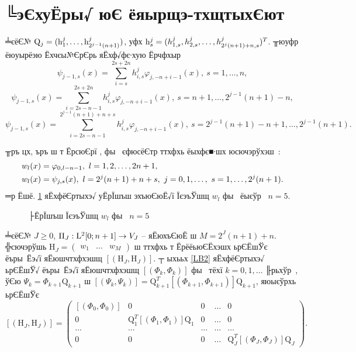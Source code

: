 \documentclass[12pt, a4paper, oneside]{article}
\begin{document}
\section{╚эЄхуЁры√ юЄ ёяырщэ-тхщтыхЄют}
╧єёЄ№ ${\rm Q}_j=({\rm h}_1^j,\dots,{\rm h}_{2^{j-1}(n+1)}^j)$, уфх ${\rm h}_s^j=(h_{1,s}^j,h_{2,s}^j,\dots,h_{2^j (n+1)+n,s}^j)^T$. ╥юуфр   ёюуырёэю Ёхчєы№ЄрЄрь яЁхф√фє∙хую Ёрчфхыр
\begin{equation}\label{U31}
\psi_{j-1,s}(x)=\sum\limits_{i=s}^{2s+2n}h_{i,s}^j\varphi_{j,-n+i-1}(x),~s=1,\dots,n,
\end{equation}
\begin{equation}\label{U32}
\psi_{j-1,s}(x)=\sum\limits_{i=2s-n-1}^{2s+2n}h_{i,s}^j\varphi_{j,-n+i-1}(x),~s=n+1,\dots,2^{j-1}(n+1)-n,
\end{equation}
\begin{equation}\label{U33}
\psi_{j-1,s}(x)=\sum\limits_{i=2s-n-1}^{2^{j-1}(n+1)+n+s}h_{i,s}^j\varphi_{j,-n+i-1}(x),~s=2^{j-1}(n+1)-n+1,\dots,2^{j-1}(n+1).
\end{equation}
\par ╥ръ цх, ъръ ш т ЁрсюЄрї \cite{Lepik1, Lepik2, Lepik3, Lepik4, Lepik}, фы  єфюсёЄтр  ттхфхь ёыхфє■∙шх юсючэрўхэш :
\begin{align}
&w_l(x)=\varphi_{0,l-n-1},~l=1,2,\dots,2n+1,\notag\\
&w_l(x)=\psi_{j,s}(x),~l=2^j(n+1)+n+s,~j=0,1,\dots,~s=1,\dots,2^{j}(n+1).\notag
\end{align}
═р Ёшё. \ref{graph_w} яЁхфёЄртыхэ√ уЁрЇшъш эхъюЄюЁ√ї ЇєэъЎшщ $w_l$ фы  ёыєўр  $n=5$.
\begin{figure}[h]
\caption{├ЁрЇшъш ЇєэъЎшщ $w_l$ фы  $n=5$}
\label{graph_w}
\end{figure}
\par ╧єёЄ№ $J\geqslant 0$,  $\Pi_{J} : {\rm L}^2[0;n+1]\to V_{J}$ -- яЁюхъЄюЁ ш $M=2^{J}(n+1)+n$. ╬сючэрўшь $\mathrm{H}_J=\begin{pmatrix}w_1 & \dots & w_M\end{pmatrix}$ ш ттхфхь т ЁрёёьюЄЁхэшх ьрЄЁшЎє ёъры Ёэ√ї яЁюшчтхфхэшщ $[(\mathrm{H}_J, \mathrm{H}_J)]$. ┬ ыхььх \ref{LB2} яЁхфёЄртыхэ√ ьрЄЁшЎ√ ёъры Ёэ√ї яЁюшчтхфхэшщ $[(\Phi_k, \Phi_k)]$ фы  тёхї $k=0,1,\dots$ ╟рьхўр , ўЄю $\Psi_k = \Phi_{k+1}\mathrm{Q}_{k+1}$ ш
$[(\Psi_k,\Psi_k)]=\mathrm{Q}_{k+1}^T[( \Phi_{k+1}, \Phi_{k+1})]\mathrm{Q}_{k+1}$,
яюыєўрхь ьрЄЁшЎє
\[
[(\mathrm{H}_J, \mathrm{H}_J)]=\begin{pmatrix}
[(\Phi_0, \Phi_0)] & 0 & 0 & \dots & 0\\
0 & \mathrm{Q}_{1}^T[( \Phi_{1}, \Phi_{1})]\mathrm{Q}_{1} & 0 & \dots & 0 \\
\dots & \dots & \dots & \dots & \dots \\
0 & 0 & 0 & \dots & \mathrm{Q}_{J}^T[( \Phi_{J}, \Phi_{J})]\mathrm{Q}_{J}
\end{pmatrix}.
\]
\end{document}
